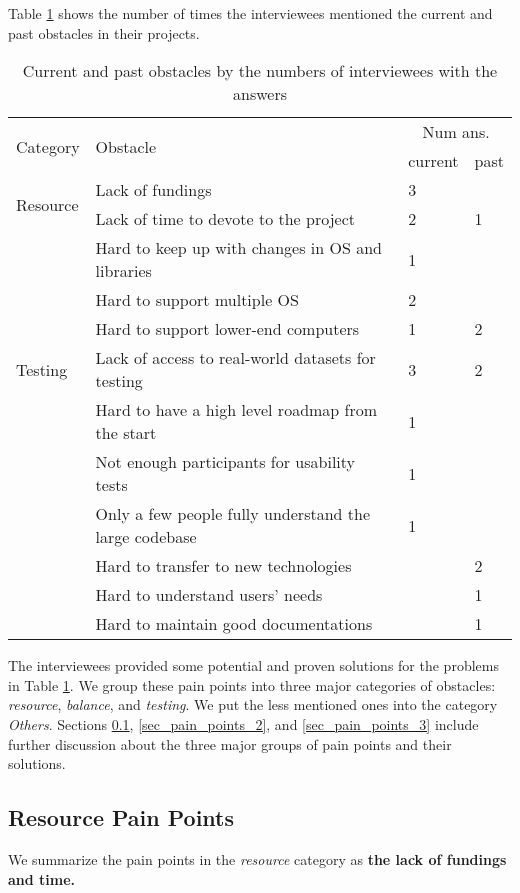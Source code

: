 Table \ref{tab_obstacles} shows the number of times the interviewees mentioned the current and past obstacles in their projects.

\begin{table}[H]
\centering
\begin{tabular}{llll}
\hline
\multirow{2}{*}{Category} & \multirow{2}{*}{Obstacle} & \multicolumn{2}{c}{Num ans.} \\ \cline{3-4} 
 &  & current & past \\ \hline
\multirow{2}{*}{Resource} & Lack of fundings & 3 &  \\
 & Lack of time to devote to the project & 2 & 1 \\ \hdashline
\multirow{3}{*}{Balance} & Hard to keep up with changes in OS and libraries & 1 &  \\
 & Hard to support multiple OS & 2 &  \\
 & Hard to support lower-end computers & 1 & 2 \\ \hdashline
Testing & Lack of access to real-world datasets for testing & 3 & 2 \\ \hdashline
\multirow{7}{*}{Others}
 & Hard to have a high level roadmap from the start & 1 &  \\
 & Not enough participants for usability tests & 1 &  \\
 & Only a few people fully understand the large codebase & 1 &  \\
 & Hard to transfer to new technologies & & 2 \\
 & Hard to understand users' needs & & 1 \\
 & Hard to maintain good documentations & & 1 \\ \hline
\end{tabular}
\caption{\label{tab_obstacles}Current and past obstacles by the numbers of interviewees with the answers}
\end{table}

The interviewees provided some potential and proven solutions for the problems in Table \ref{tab_obstacles}. We group these pain points into three major categories of obstacles: \textit{resource}, \textit{balance}, and \textit{testing}. We put the less mentioned ones into the category \textit{Others}. Sections \ref{sec_pain_points_1}, \ref{sec_pain_points_2}, and \ref{sec_pain_points_3} include further discussion about the three major groups of pain points and their solutions.

\subsection{Resource Pain Points}
\label{sec_pain_points_1}
We summarize the pain points in the \textit{resource} category as
\textbf{the lack of fundings and time.}

